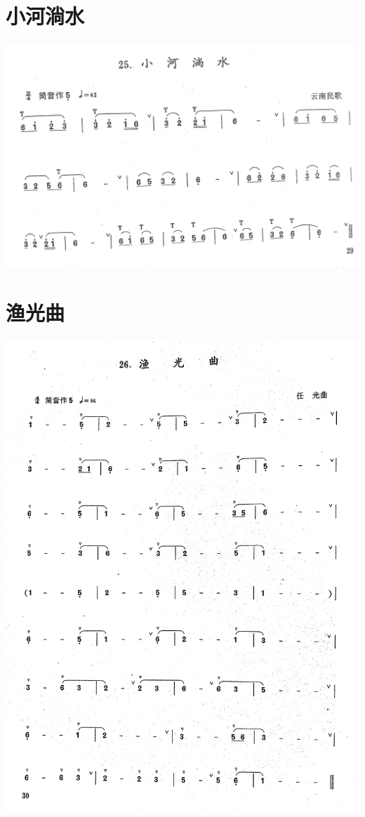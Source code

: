 \documentclass[cn,pad,chinese,chinesefont=nofont]{elegantbook}
\begin{document}
\section{小河淌水}           
	\includegraphics[width=\textwidth]{dongxiao/IMG_0938.jpg}  
\section{渔光曲}           
	\includegraphics[width=\textwidth]{dongxiao/IMG_0939.jpg}   
\end{document}
